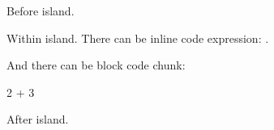 \documentclass{article}
\begin{document}
Before island.

\begin{island}

Within island. There can be inline code expression: .

And there can be block code chunk:

\begin{chunk}
2 + 3
\end{chunk}

\end{island}

After island.
\end{document}
